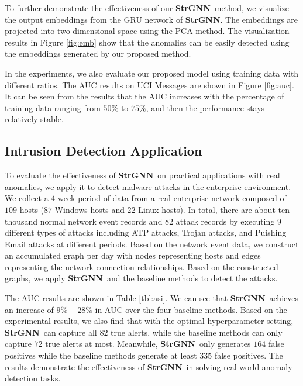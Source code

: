 \documentclass{article}
\newcommand{\model}{\textbf{StrGNN}~}
\newcommand{\modele}{\textbf{StrGNN}}
\begin{document}
To further demonstrate the effectiveness of our \model method, we visualize the output embeddings from the GRU network of \modele. The embeddings are projected into two-dimensional space using the PCA method. The visualization results in Figure \ref{fig:emb} show that the anomalies can be easily detected using the embeddings generated by our proposed method.

In the experiments, we also evaluate our proposed model using training data with different ratios. The AUC results on UCI Messages are shown in Figure \ref{fig:auc}. It can be seen from the results that the AUC increases with the percentage of training data ranging from $50\%$ to $75\%$, and then the performance stays relatively stable.


\subsection{Intrusion Detection Application} 

To evaluate the effectiveness of \model on practical applications with real anomalies, we apply it to detect malware attacks in the enterprise environment.
We collect a $4$-week period of data from a real enterprise network composed of $109$ hosts ($87$ Windows hosts and $22$ Linux hosts). In total, there are about ten thousand normal network event records and $82$ attack records by executing $9$ different types of attacks including ATP attacks, Trojan attacks, and Puishing Email attacks at different periods. Based on the network event data, we construct an accumulated graph per day with nodes representing hosts and edges representing the network connection relationships. Based on the constructed graphs, we apply \model and the baseline methods to detect the attacks.

The AUC results are shown in Table \ref{tbl:asi}. We can see that \model achieves an increase of $9\%-28\%$ in AUC over the four baseline methods. Based on the experimental results, we also find that with the optimal hyperparameter setting, \model can capture all $82$ true alerts, while the baseline methods can only capture $72$ true alerts at most. Meanwhile, \model only generates $164$ false positives while the baseline methods generate at least $335$ false positives. The results demonstrate the effectiveness of \model in solving real-world anomaly detection tasks. 
\end{document}
